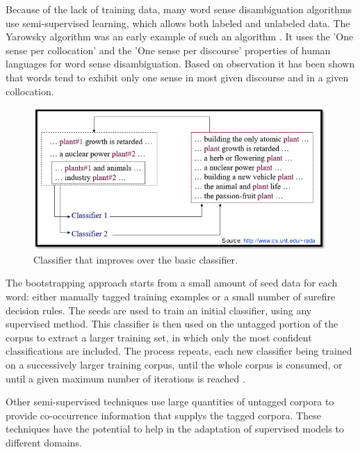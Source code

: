 Because of the lack of training data, many word sense disambiguation algorithms use semi-supervised learning, which allows both labeled and unlabeled data. 
The Yarowsky algorithm was an early example of such an algorithm \cite{Gartner201317}. 
It uses the 'One sense per collocation' and the 'One sense per discourse' properties of human languages for word sense disambiguation. 
Based on observation it has been shown that words tend to exhibit only one sense in most given discourse and in a given collocation. \cite{5599823}

\begin{figure}[tbh]
	\begin{center}
		\includegraphics[width=\columnwidth]{Union_Background_Chart_semi}
	\end{center}
	\caption{Classifier that improves over the basic classifier. \label{fig3}}
\end{figure}

The bootstrapping approach starts from a small amount of seed data for each word: either manually tagged training examples or a small number of surefire decision rules. 
The seeds are used to train an initial classifier, using any supervised method. This classifier is then used on the untagged portion of the corpus to extract a larger training set, in which only the most confident classifications are included. 
The process repeats, each new classifier being trained on a successively larger training corpus, until the whole corpus is consumed, 
or until a given maximum number of iterations is reached \cite{Blascheck2016}.

Other semi-supervised techniques use large quantities of untagged corpora to provide co-occurrence information that supplys 
the tagged corpora. 
These techniques have the potential to help in the adaptation of supervised models to different domains.

